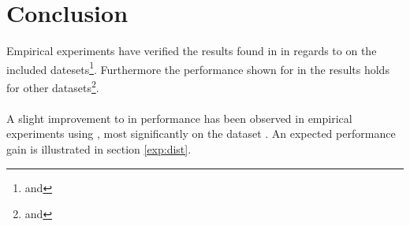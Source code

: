 \section{Conclusion}
\label{conclusion}
Empirical experiments have verified the results found in \cite{wagner17} in regards to \qs{} on the included datesets\footnote{\mnist{} and \sift{}}. Furthermore the performance shown for \qs{} in the results holds for other datasets\footnote{\gist{} and \clust{}}.
\\
\\
A slight improvement to \qs{} in performance has been observed in empirical experiments using \qsr{}, most significantly on the dataset \mnist{}. An expected performance gain is illustrated in section \ref{exp:dist}. 
